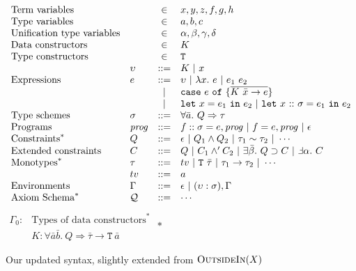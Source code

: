 \documentclass[a4paper]{jfp}
\newcommand{\outsidein}{\textsc{OutsideIn}(X)}
\begin{document}
\begin{figure}
	\caption{Our updated syntax, slightly extended from $\outsidein$}
   	\begin{displaymath}
	\begin{array}{llcl}
		\text{Term variables} & & \in & x, y, z, f, g, h \\
		\text{Type variables} & & \in & a, b, c \\
		\text{Unification type variables} & & \in & \alpha, \beta, \gamma, \delta \\
		\text{Data constructors} & & \in & K \\
		\text{Type constructors} & & \in & {\tt T} \\
		& \upsilon & ::= & K\ |\ x \\
		\text{Expressions} & e & ::=  & \upsilon\ |\ \lambda x.\ e\ |\ e_1\ e_2\ \\
		                   &   & | & \mathtt{case}\ e\ \mathtt{of}\ \{\overline{K\ \bar{x} \rightarrow e} \} \\
		                   &   & | & \mathtt{let}\ x = e_1\ \mathtt{in}\ e_2\ |\ \mathtt{let}\ x\ \mathtt{::}\ \sigma = e_1\ \mathtt{in}\ e_2\\
		\text{Type schemes} & \sigma & ::= & \forall \bar{a}.\ Q \Rightarrow \tau \\
      \text{Programs} & \mathit{prog} & ::= & f :: \sigma = e, \mathit{prog}\ |\ f = e, \mathit{prog}\ |\ \epsilon \\                     
		\text{Constraints}^* & Q & ::= & \epsilon\ |\ Q_1 \land Q_2\ |\ \tau_1 \sim \tau_2\ |\ \cdots  \\
		\text{Extended constraints} & C & ::= & Q\ |\ C_1 \land' C_2\ |\ \exists \bar{\beta}.\ Q \supset C\ |\ \Finv \alpha.\ C \\
		\text{Monotypes}^* & \tau & ::= & tv\ |\ \mathtt{T}\ \bar{\tau}\ |\ \tau_1 \rightarrow \tau_2\ |\ \cdots \\
		 & tv & ::= & a \\
		\text{Environments} & \Gamma & ::= & \epsilon\ |\ (\upsilon : \sigma), \Gamma \\
		\text{Axiom Schema}^* & \mathcal{Q} & ::= & \cdots \\
	\end{array}	
	\end{displaymath}
	\begin{math}
		\begin{array}{ll}
		\Gamma_0: &  \text{Types of data constructors}^* \\
		& K : \forall\bar{a}\bar{b}.\ Q \Rightarrow \bar{\tau} \rightarrow \mathtt{T}\ \bar{a}
		\end{array}
		\end{math}
   $*$ 
   \label{fig:constraints}
\end{figure}
\end{document}
